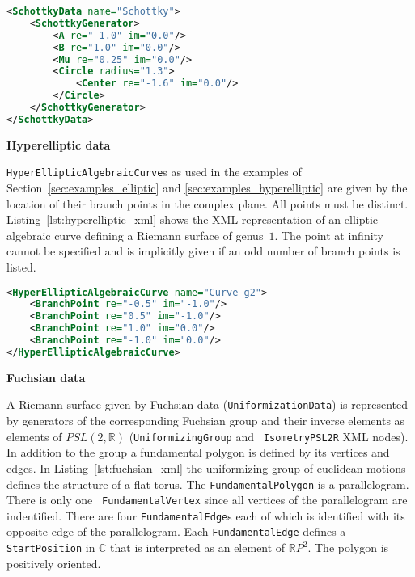 \documentclass[Thesis.tex]{subfiles}
\begin{document}
\begin{lstlisting}[label=lst:schottky_xml, caption={A torus given by schotty data}, 
numbers=none, language=XML, captionpos=b]
<SchottkyData name="Schottky">
	<SchottkyGenerator>
		<A re="-1.0" im="0.0"/>
		<B re="1.0" im="0.0"/>
		<Mu re="0.25" im="0.0"/>
		<Circle radius="1.3">
			<Center re="-1.6" im="0.0"/>
		</Circle>
	</SchottkyGenerator>
</SchottkyData>
\end{lstlisting}

{\bf Hyperelliptic data} 

{\tt HyperEllipticAlgebraicCurve}s as used in the examples of
Section~\ref{sec:examples_elliptic} and \ref{sec:examples_hyperelliptic} are
given by the location of their branch points in the complex plane. All points
must be distinct. Listing~\ref{lst:hyperelliptic_xml} shows the XML
representation of an elliptic algebraic curve defining a Riemann surface of
genus~$1$. The point at infinity cannot be specified and is implicitly given if
an odd number of branch points is listed.

\begin{lstlisting}[label=lst:hyperelliptic_xml, caption={A torus given as 
hyperelliptic data}, numbers=none, language=XML, captionpos=b]
<HyperEllipticAlgebraicCurve name="Curve g2">
	<BranchPoint re="-0.5" im="-1.0"/>
	<BranchPoint re="0.5" im="-1.0"/>
	<BranchPoint re="1.0" im="0.0"/>
	<BranchPoint re="-1.0" im="0.0"/>
</HyperEllipticAlgebraicCurve>
\end{lstlisting}

{\bf Fuchsian data}

A Riemann surface given by Fuchsian data ({\tt UniformizationData}) is
represented by generators of the corresponding Fuchsian group and their inverse
elements as elements of $PSL(2,\mathbb R)$ ({\tt UniformizingGroup} and {\tt
IsometryPSL2R} XML nodes). In addition to the group a fundamental polygon is
defined by its vertices and edges. In Listing~\ref{lst:fuchsian_xml} the
uniformizing group of euclidean motions defines the structure of a flat torus.
The {\tt FundamentalPolygon} is a parallelogram. There is only one {\tt
FundamentalVertex} since all vertices of the parallelogram are indentified.
There are four {\tt FundamentalEdge}s each of which is identified with its
opposite edge of the parallelogram. Each {\tt FundamentalEdge} defines a {\tt
StartPosition} in $\mathbb C$ that is interpreted as an element of $\mathbb R
P^2$. The polygon is positively oriented.
\end{document}
